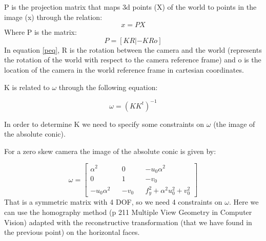 \documentclass[11pt, oneside]{article}   	%
\begin{document}
P is the projection matrix that maps 3d points (X) of the world to points in the image (x) through the relation:
\begin{equation} \label{peq1}
x = P X
\end{equation}
Where P is the matrix:
\begin{equation} \label{peq}
P=[KR | -KRo]
\end{equation}
In equation \ref{peq}, R is the rotation between the camera and the world (represents the rotation of the world with respect to the camera reference frame) and o is the location of the camera in the world reference frame in cartesian coordinates.

K is related to $\omega$ through the following equation:

$$
\omega = (KK^t)^{-1}
$$

In order to determine K we need to specify some constraints on $\omega$ (the image of the absolute conic).

For a zero skew camera the image of the absolute conic is given by:

\begin{equation} \label{omegaeq}
\omega = 
\begin{bmatrix}
\alpha^2 && 0 && -u_0 \alpha^2 \\ 0 && 1 && -v_0 \\  -u_0 \alpha^2 && -v_0 && f_y^2 +\alpha^2 u_0^2 + v_0^2
\end{bmatrix}
\end{equation}
That is a symmetric matrix with 4 DOF, so we need 4 constraints on $\omega$.
Here we can use the homography method (p 211 Multiple View Geometry in Computer Vision) adapted with the reconstructive transformation (that we have found in the previous point) on the horizontal faces.
\end{document}

